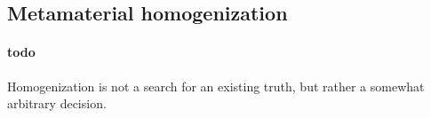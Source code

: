 %  



\subsection{Metamaterial homogenization} %
\paragraph{todo}%


Homogenization is not a search for an existing truth, but rather a somewhat arbitrary decision.

\cite{Andryieuski2012-Blochmode_analysis_for_effparam.pdf}
% 
% 
\cite{Hasar2011-Retrieval_of_effparam_bianisotropic.pdf}
% 
% 
\cite{Chalapat2009-Wideband_reference_plane_invariant.pdf}
% 
% 
\cite{Chen2004.pdf}
% 
% 
\cite{Li2009.pdf}
% 
% 
\cite{Rockstuhl2008.pdf}
% 
% 
\cite{Silverinha-Metamaterial_homogenization.pdf}
% 
% 
\cite{Smith2005-Elmg_parameter_retrieval_from_inhom_metamaterials.pdf}
% 
% 
\cite{Szabo2010.pdf}
% 
% 
\cite{Yang2010.pdf}
% 
% 


